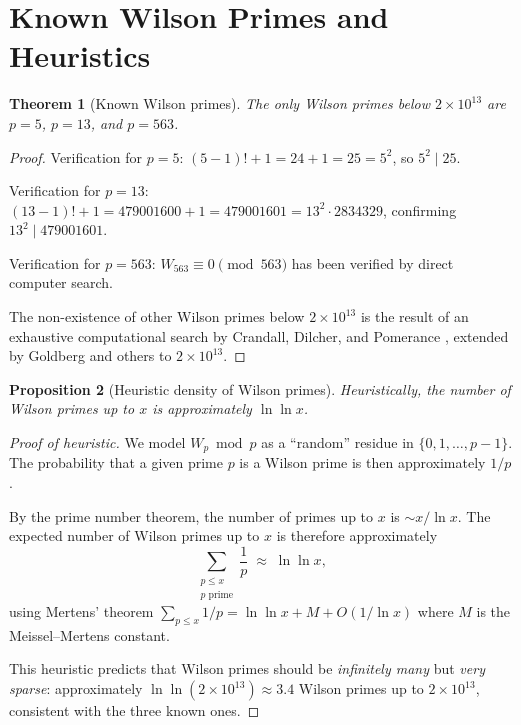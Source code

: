 \documentclass[12pt,a4paper]{amsart}
\newtheorem{theorem}{Theorem}[section]
\newtheorem{proposition}[theorem]{Proposition}
\theoremstyle{definition}
\begin{document}
\section{Known Wilson Primes and Heuristics}

\begin{theorem}[Known Wilson primes]\label{thm:known_wilson}
  The only Wilson primes below $2 \times 10^{13}$ are $p = 5$, $p = 13$,
  and $p = 563$.
\end{theorem}

\begin{proof}
  Verification for $p = 5$:
  $(5-1)! + 1 = 24 + 1 = 25 = 5^2$, so $5^2 \mid 25$. \checkmark

  Verification for $p = 13$:
  $(13-1)! + 1 = 479001600 + 1 = 479001601 = 13^2 \cdot 2834329$,
  confirming $13^2 \mid 479001601$. \checkmark

  Verification for $p = 563$:
  $W_{563} \equiv 0 \pmod{563}$ has been verified by direct computer search.

  The non-existence of other Wilson primes below $2 \times 10^{13}$ is the
  result of an exhaustive computational search by Crandall, Dilcher, and
  Pomerance \cite{Crandall1997}, extended by Goldberg and others to $2 \times
  10^{13}$.
\end{proof}

\begin{proposition}[Heuristic density of Wilson primes]\label{prop:heuristic}
  Heuristically, the number of Wilson primes up to $x$ is approximately
  $\ln \ln x$.
\end{proposition}

\begin{proof}[Proof of heuristic]
  We model $W_p \bmod p$ as a ``random'' residue in $\{0, 1, \ldots, p-1\}$.
  The probability that a given prime $p$ is a Wilson prime is then
  approximately $1/p$.

  By the prime number theorem, the number of primes up to $x$ is $\sim x/\ln x$.
  The expected number of Wilson primes up to $x$ is therefore approximately
  \[
    \sum_{\substack{p \leq x \\ p \text{ prime}}} \frac{1}{p}
    \;\approx\; \ln \ln x,
  \]
  using Mertens' theorem $\sum_{p \leq x} 1/p = \ln \ln x + M + O(1/\ln x)$
  where $M$ is the Meissel--Mertens constant.

  This heuristic predicts that Wilson primes should be \emph{infinitely many}
  but \emph{very sparse}: approximately $\ln\ln(2 \times 10^{13}) \approx 3.4$
  Wilson primes up to $2 \times 10^{13}$, consistent with the three known ones.
\end{proof}
\end{document}
